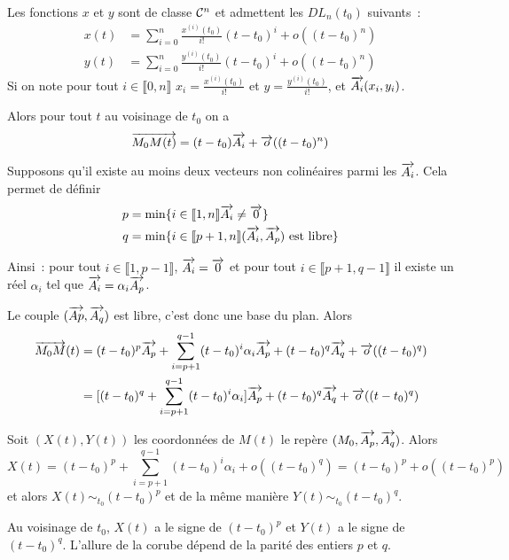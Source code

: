 Les fonctions \(x\) et \(y\) sont de classe \(\mathcal{C}^{n}\) et admettent les 
\(DL_n(t_0)\) suivants~:
\begin{align*}
  x(t) &= \sum_{i = 0}^n \frac{x^{(i)}(t_0)}{i!} (t-t_0)^i + o((t-t_0)^n) \\
y(t) &= \sum_{i = 0}^n \frac{y^{(i)}(t_0)}{i!} (t-t_0)^i + o((t-t_0)^n) 
\end{align*}
Si on note pour tout \(i \in \llbracket 0,n \rrbracket\) 
\(x_i = \frac{x^{(i)}(t_0)}{i!}\) et \(y = \frac{y^{(i)}(t_0)}{i!}\), et 
\(\overrightarrow{A_i}(x_i,y_i)\).

Alors pour tout \(t\) au voisinage de \(t_0\) on a
\begin{equation}
  \overrightarrow{M_0M(t)} = (t-t_0)\overrightarrow{A_i} +\overrightarrow{o}((t-t_0)^n)
\end{equation}


Supposons qu'il existe au moins deux vecteurs non colinéaires parmi les 
\(\overrightarrow{A_i}\). Cela permet de définir
\begin{align*}
  p &= \min \{i \in \llbracket 1,n \rrbracket \overrightarrow{A_i} \neq \overrightarrow{0} \} \\
  q &= \min \{i \in \llbracket p+1,n \rrbracket (\overrightarrow{A_i},\overrightarrow{A_p}) 
  \text{~est libre}\}
\end{align*}

Ainsi~: pour tout \(i \in \llbracket 1, p-1 \rrbracket\), 
\(\overrightarrow{A_i} = \overrightarrow{0}\) et pour tout \(i \in \llbracket p+1, q-1 \rrbracket\) il 
existe un réel \(\alpha_i\) tel que \(\overrightarrow{A_i} = \alpha_i \overrightarrow{A_p}\).

Le couple \((\overrightarrow{Ap}, \overrightarrow{A_q})\) est libre, c'est donc une base du plan. 
Alors
\begin{align*}
  \overrightarrow{M_0M}(t) &= (t-t_0)^p \overrightarrow{A_p} + \sum_{i = p+1}^{q-1} (t-t_0)^i \alpha_i 
  \overrightarrow{A_p} +(t-t_0)^q \overrightarrow{A_q} +\overrightarrow{o}((t-t_0)^q) \\
  & = [(t-t_0)^q + \sum_{i = p+1}^{q-1} (t-t_0)^i \alpha_i]\overrightarrow{A_p} + (t-t_0)^q 
  \overrightarrow{A_q} +\overrightarrow{o}((t-t_0)^q)
\end{align*}

Soit \((X(t),Y(t))\) les coordonnées de \(M(t)\) le repère 
\((M_0,\overrightarrow{A_p},\overrightarrow{A_q})\). Alors
\begin{equation}
  X(t) = (t-t_0)^p+\sum_{i = p+1}^{q-1} (t-t_0)^i \alpha_i + o((t-t_0)^q) = 
  (t-t_0)^p + o((t-t_0)^p)
\end{equation}
et alors \(X(t) \sim_{t_0} (t-t_0)^p\) et de la même manière \(Y(t) 
\sim_{t_0}(t-t_0)^q\).

Au voisinage de \(t_0\), \(X(t)\) a le signe de \((t-t_0)^p\) et \(Y(t)\) a le 
signe de \((t-t_0)^q\). L'allure de la corube dépend de la parité des entiers 
\(p\) et \(q\).


